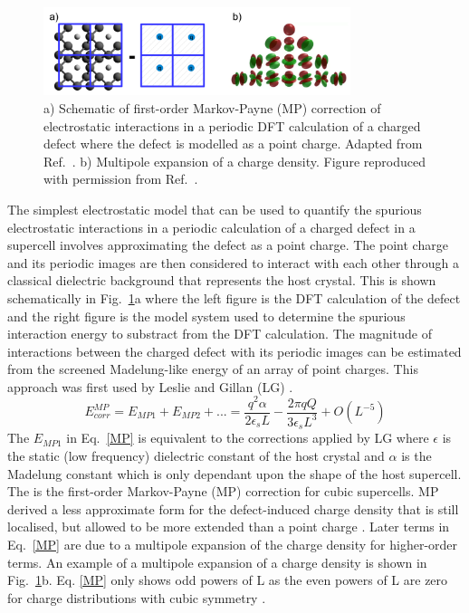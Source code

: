 \documentclass[11pt, twoside]{report}
\begin{document}
\begin{figure}[h!]
  \centering
    \includegraphics[width=0.8\textwidth]{figures/IIC.png}
    \caption[a) Schematic of first-order Markov-Payne (MP) correction of electrostatic interactions in a periodic DFT calculation of a charged defect where the defect is modelled as a point charge.  b) Multipole expansion of a charge density.]{a) Schematic of first-order Markov-Payne (MP) correction of electrostatic interactions in a periodic DFT calculation of a charged defect where the defect is modelled as a point charge. Adapted from Ref.~. b) Multipole expansion of a charge density. Figure reproduced with permission from Ref.~.}
  \label{IIC}
\end{figure}

The simplest electrostatic model that can be used to quantify the spurious electrostatic interactions in a periodic calculation of a charged defect in a supercell involves approximating the defect as a point charge. The point charge and its periodic images are then considered to interact with each other through a classical dielectric background that represents the host crystal. This is shown schematically in Fig.~\ref{IIC}a where the left figure is the DFT calculation of the defect and the right figure is the model system used to determine the spurious interaction energy to substract from the DFT calculation. The magnitude of interactions between the charged defect with its periodic images can be estimated from the screened Madelung-like energy of an array of point charges. This approach was first used by Leslie and Gillan (LG) \cite{LeslieGillan}. 
\begin{equation}\label{MP}
E^{MP}_{corr} = E_{MP1} + E_{MP2} + ... = \frac{q^2\alpha}{2 \epsilon_s L} - \frac{2 \pi q Q}{3 \epsilon_s L^3} + O(L^{-5})
\end{equation}
The $E_{MP1}$ in Eq.~\ref{MP} is equivalent to the corrections applied by LG where $\epsilon$ is the static (low frequency) dielectric constant of the host crystal and $\alpha$ is the Madelung constant which is only dependant upon the shape of the host supercell. The is the first-order Markov-Payne (MP) correction for cubic supercells.
MP derived a less approximate form for the defect-induced charge density that is still localised, but allowed to be more extended than a point charge \cite{MP}. Later terms in Eq.~\ref{MP} are due to a multipole expansion of the charge density for higher-order terms. An example of a multipole expansion of a charge density is shown in Fig.~\ref{IIC}b. Eq. \ref{MP} only shows odd powers of L as the even powers of L are zero for charge distributions with cubic symmetry \cite{Durrant_defects}.
\end{document}

